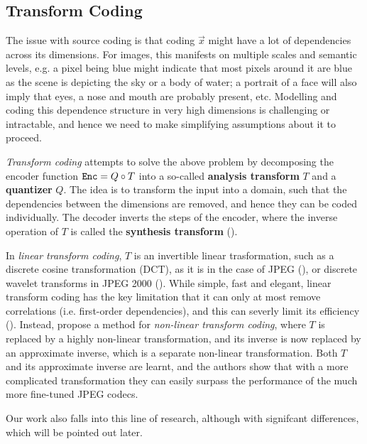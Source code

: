 \subsection{Transform Coding}
\label{sec:transform_coding}
The issue with source coding is that coding $\vec{x}$ might have a lot of
dependencies across its dimensions. For images, this manifests on multiple
scales and semantic levels, e.g. a pixel being blue might indicate that most
pixels around it are blue as the scene is depicting the sky or a body of water;
a portrait of a face will also imply that eyes, a nose and mouth are probably
present, etc. Modelling and coding this dependence structure in very high
dimensions is challenging or intractable, and hence we need
to make simplifying assumptions about it to proceed.
\par
\textit{Transform coding} attempts to solve the above problem by decomposing the
encoder function $\mathtt{Enc} = Q \circ T$ into a so-called \textbf{analysis transform}
$T$ and a \textbf{quantizer} $Q$. The idea is to transform the input into a
domain, such that the dependencies between the dimensions are removed, and hence
they can be coded individually. The decoder inverts the steps of the encoder,
where the inverse operation of $T$ is called the \textbf{synthesis transform}
(\cite{gupta2011modified}).
\par
In \textit{linear transform coding}, $T$ is an invertible linear trasformation,
such as a discrete cosine transformation (DCT), as it is in the case of JPEG
(\cite{wallace1992jpeg}), or discrete wavelet transforms in JPEG 2000
(\cite{rabbani2002overview}). While simple, fast and elegant, linear transform
coding has the key limitation that it can only at most remove correlations (i.e.
first-order dependencies), and this can severly limit its efficiency
(\cite{balle2016endtrans}). Instead, \cite{balle2016endtrans} propose a method for
\textit{non-linear transform coding}, where $T$ is replaced by a highly
non-linear transformation, and its inverse is now replaced by an approximate
inverse, which is a separate non-linear transformation. Both $T$ and its
approximate inverse are learnt, and the authors show that with a more
complicated transformation they can easily surpass the performance of the much
more fine-tuned JPEG codecs.
\par
Our work also falls into this line of research, although with signifcant
differences, which will be pointed out later.

